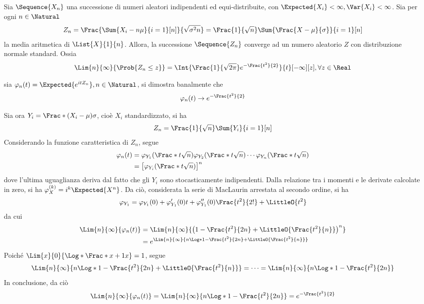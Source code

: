 \documentclass{subfiles}
\begin{document}
\begin{Theorem*}
    Sia $\Sequence{X_{n}}$ una successione di numeri aleatori indipendenti ed equi-distribuite, con $\Expected{X_{i}} < \infty, \Var{X_{i}} < \infty$.
    Sia per ogni $n \in \Natural$
    $$
        Z_{n} = \Frac{\Sum{X_{i} - n\mu}{i = 1}[n]}{\sqrt{\sigma^{2} n}} = \Frac{1}{\sqrt{n}} \Sum{\Frac{X - \mu}{\sigma}}{i = 1}[n]
    $$
    la media aritmetica di \(\List{X}{1}{n}\).
    Allora, la successione $\Sequence{Z_{n}}$ converge ad un numero aleatorio $Z$ con distribuzione normale standard.
    Ossia
    $$
        \Lim{n}{\infty}{\Prob{Z_{n} \le z}} = \Int{\Frac{1}{\sqrt{2\pi}} e^{-\Frac{t^{2}}{2}}}{t}[-\infty][z], \forall z \in \Real
    $$
    \begin{Proof*}
        sia $\varphi_{n}(t) = \Expected{e^{itZ_{n}}}, n \in \Natural$, si dimostra banalmente che
        $$
            \varphi_{n}(t) \to e^{-\Frac{t^{2}}{2}}
        $$

        Sia ora $Y_{i} = \Frac*{(X_{i} - \mu)}{\sigma}$, cioè $X_{i}$ standardizzato, si ha
        $$
            Z_{n} = \Frac{1}{\sqrt{n}} \Sum{Y_{i}}{i = 1}[n]
        $$
        Considerando la funzione caratteristica di $Z_{n}$, segue
        $$\begin{aligned}
                \varphi_{n}(t) & = \varphi_{Y_{1}}(\Frac*{t}{\sqrt{n}}) \varphi_{Y_{2}}(\Frac*{t}{\sqrt{n}}) \cdots \varphi_{Y_{n}}(\Frac*{t}{\sqrt{n}}) \\
                               & = \left[ \varphi_{Y_{i}}(\Frac*{t}{\sqrt{n}}) \right]^{n}
            \end{aligned}$$
        dove l'ultima uguaglianza deriva dal fatto che gli $Y_{i}$ sono stocasticamente indipendenti.
        Dalla relazione tra i momenti e le derivate calcolate in zero, si ha $\varphi_{X}^{(k)} = i^{k} \Expected{X^{n}}$.
        Da ciò, considerata la serie di MacLaurin arrestata al secondo ordine, si ha
        $$
            \varphi_{Y_{1}} = \varphi_{Y_{1}}(0) + \varphi_{Y_{1}}'(0)t + \varphi_{Y_{1}}''(0) \Frac{t^{2}}{2!} + \LittleO{t^{2}}
        $$
        da cui
        $$\begin{aligned}
                \Lim{n}{\infty}{\varphi_{n}(t)} & = \Lim{n}{\infty}{\left(1 - \Frac{t^{2}}{2n} + \LittleO{\Frac{t^{2}}{n}}\right)^{n}} \\
                                                & = e^{\Lim{n}{\infty}{n \Log*{1 - \Frac{t^{2}}{2n} + \LittleO{\Frac{t^{2}}{n}}}}}
            \end{aligned}$$
        Poiché $\Lim{x}{0}{\Log*{\Frac*{x + 1}{x}}} = 1$, segue
        $$
            \Lim{n}{\infty}{n \Log*{1 - \Frac{t^{2}}{2n} + \LittleO{\Frac{t^{2}}{n}}}} = \cdots = \Lim{n}{\infty}{n \Log*{1 - \Frac{t^{2}}{2n}}}
        $$
        In conclusione, da ciò
        $$
            \Lim{n}{\infty}{\varphi_{n}(t)} = \Lim{n}{\infty}{n \Log*{1 - \Frac{t^{2}}{2n}}} = e^{-\Frac{t^{2}}{2}}
        $$
    \end{Proof*}
\end{Theorem*}
\end{document}
